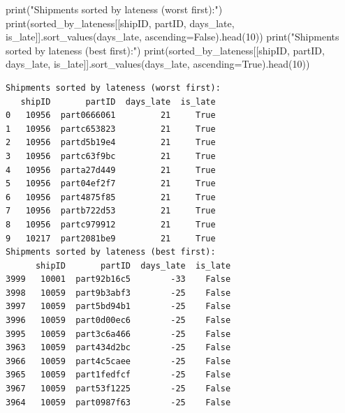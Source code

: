\documentclass[
]{article}
\newenvironment{Shaded}{\begin{snugshade}}{\end{snugshade}}
\newcommand{\BuiltInTok}[1]{\textcolor[rgb]{0.00,0.23,0.31}{#1}}
\newcommand{\DecValTok}[1]{\textcolor[rgb]{0.68,0.00,0.00}{#1}}
\newcommand{\NormalTok}[1]{\textcolor[rgb]{0.00,0.23,0.31}{#1}}
\newcommand{\OperatorTok}[1]{\textcolor[rgb]{0.37,0.37,0.37}{#1}}
\newcommand{\StringTok}[1]{\textcolor[rgb]{0.13,0.47,0.30}{#1}}
\newcommand{\VariableTok}[1]{\textcolor[rgb]{0.07,0.07,0.07}{#1}}
\begin{document}
\label{sorting-strategies-1}
\begin{Shaded}
\begin{Highlighting}[]
\BuiltInTok{print}\NormalTok{(}\StringTok{"Shipments sorted by lateness (worst first):"}\NormalTok{)}
\BuiltInTok{print}\NormalTok{(sorted\_by\_lateness[[}\StringTok{\textquotesingle{}shipID\textquotesingle{}}\NormalTok{, }\StringTok{\textquotesingle{}partID\textquotesingle{}}\NormalTok{, }\StringTok{\textquotesingle{}days\_late\textquotesingle{}}\NormalTok{, }\StringTok{\textquotesingle{}is\_late\textquotesingle{}}\NormalTok{]].sort\_values(}\StringTok{\textquotesingle{}days\_late\textquotesingle{}}\NormalTok{, ascending}\OperatorTok{=}\VariableTok{False}\NormalTok{).head(}\DecValTok{10}\NormalTok{))}
\BuiltInTok{print}\NormalTok{(}\StringTok{"Shipments sorted by lateness (best first):"}\NormalTok{)}
\BuiltInTok{print}\NormalTok{(sorted\_by\_lateness[[}\StringTok{\textquotesingle{}shipID\textquotesingle{}}\NormalTok{, }\StringTok{\textquotesingle{}partID\textquotesingle{}}\NormalTok{, }\StringTok{\textquotesingle{}days\_late\textquotesingle{}}\NormalTok{, }\StringTok{\textquotesingle{}is\_late\textquotesingle{}}\NormalTok{]].sort\_values(}\StringTok{\textquotesingle{}days\_late\textquotesingle{}}\NormalTok{, ascending}\OperatorTok{=}\VariableTok{True}\NormalTok{).head(}\DecValTok{10}\NormalTok{))}
\end{Highlighting}
\end{Shaded}

\begin{verbatim}
Shipments sorted by lateness (worst first):
   shipID       partID  days_late  is_late
0   10956  part0666061         21     True
1   10956  partc653823         21     True
2   10956  partd5b19e4         21     True
3   10956  partc63f9bc         21     True
4   10956  parta27d449         21     True
5   10956  part04ef2f7         21     True
6   10956  part4875f85         21     True
7   10956  partb722d53         21     True
8   10956  partc979912         21     True
9   10217  part2081be9         21     True
Shipments sorted by lateness (best first):
      shipID       partID  days_late  is_late
3999   10001  part92b16c5        -33    False
3998   10059  part9b3abf3        -25    False
3997   10059  part5bd94b1        -25    False
3996   10059  part0d00ec6        -25    False
3995   10059  part3c6a466        -25    False
3963   10059  part434d2bc        -25    False
3966   10059  part4c5caee        -25    False
3965   10059  part1fedfcf        -25    False
3967   10059  part53f1225        -25    False
3964   10059  part0987f63        -25    False
\end{verbatim}
\end{document}
